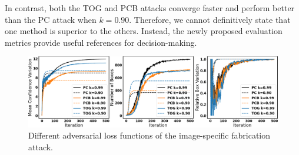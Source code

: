 In contrast, both the TOG and PCB attacks converge faster and perform better than the PC attack when $k=0.90$. Therefore, we cannot definitively state that one method is superior to the others. Instead, the newly proposed evaluation metrics provide useful references for decision-making.


\begin{figure}[H]
    \centering
    \includegraphics[width=\textwidth]{figures/chapter_detection/hardware/loss.png}
    \caption{Different adversarial loss functions of the  image-specific  fabrication attack.}
    \label{fig:loss}
\end{figure}

